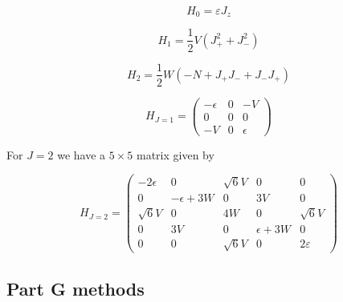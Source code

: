 \begin{equation}
    H_0=\varepsilon J_z
\end{equation}

\begin{equation}
    H_1=\frac{1}{2}V(J_+^2+J_-^2)
\end{equation}

\begin{equation}
    H_2=\frac{1}{2}W(-N+J_+J_-+J_-J_+)
\end{equation}

\begin{equation}
    H_{J=1} = \begin{pmatrix}
        -\epsilon & 0 & -V \\
        0 & 0 & 0 \\
        -V & 0 & \epsilon
    \end{pmatrix}
\end{equation}

For $J=2$ we have a $5\times5$ matrix given by

\begin{equation}
    H_{J=2}=\begin{pmatrix}
        -2\epsilon & 0 & \sqrt{6}V & 0 & 0 \\
        0 & -\epsilon + 3W  & 0 & 3V & 0 \\
        \sqrt{6}V & 0 & 4W & 0 & \sqrt{6}V \\
        0 & 3V & 0 & \epsilon+3W & 0 \\
        0 & 0& \sqrt{6}V & 0 & 2\varepsilon
    \end{pmatrix}
\end{equation}

\subsection{Part G methods}